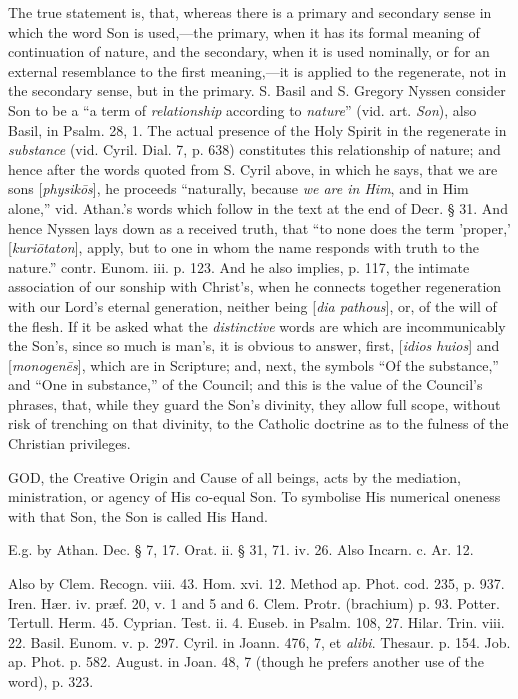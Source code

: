 The true statement is, that, whereas there is a
primary and secondary sense in which the word Son is used,—the
primary, when it has its formal meaning of continuation of nature, and
the secondary, when it is used nominally, or for an external
resemblance to the first meaning,—it is applied to the regenerate,
not in the secondary sense, but in the primary. S. Basil and S. Gregory Nyssen consider Son to be a ``a term of \emph{relationship} according to \emph{nature}''
(vid. art. \emph{Son}), also Basil, in
Psalm. 28, 1. The actual presence of the Holy Spirit in the regenerate
in \emph{substance} (vid. Cyril.
Dial. 7, p. 638) constitutes this relationship of nature; and hence
after the words quoted from S. Cyril above, in which he says, that we
are sons [\emph{physik\={o}s}], he proceeds ``naturally, because \emph{we
are in Him}, and in
Him alone,'' vid. Athan.'s words which follow in the text at the end of
Decr. § 31. And hence Nyssen lays down as a received truth, that ``to
none does the term 'proper,'
[\emph{kuri\={o}taton}], apply,
but to one in whom the name responds with truth to the nature.'' contr.
Eunom. iii. p. 123. And he also implies, p. 117, the intimate
association of our sonship with Christ's, when he connects together
regeneration with our Lord's eternal generation, neither being [\emph{dia
pathous}], or, of the will of the flesh. If it be asked what the \emph{distinctive}
words are which are incommunicably the Son's, since so much is man's,
it is obvious to answer, first, [\emph{idios huios}] and [\emph{monogen\={e}s}],
which are in Scripture; and, next, the symbols ``Of the substance,'' and
``One in substance,'' of the Council; and this is the value of the
Council's phrases, that, while they guard the Son's divinity, they
allow full scope, without risk of trenching on that divinity, to the
Catholic doctrine as to the fulness of the Christian privileges.


GOD,
the Creative Origin and Cause of all beings, acts by the mediation,
ministration, or agency of His co-equal Son. To symbolise His
numerical oneness with that Son, the Son is called His Hand.

E.g. by Athan. Dec. § 7, 17. Orat. ii. § 31,
71. iv. 26. Also Incarn. c. Ar. 12.

Also by Clem. Recogn. viii. 43. Hom. xvi. 12.
Method ap. Phot. cod. 235, p. 937. Iren. Hær. iv. præf. 20, v. 1 and
5 and 6. Clem. Protr. (brachium) p. 93. Potter. Tertull. Herm. 45.
Cyprian. Test. ii. 4. Euseb. in Psalm. 108, 27. Hilar. Trin. viii. 22.
Basil. Eunom. v. p. 297. Cyril. in Joann. 476, 7, et \emph{alibi}.
Thesaur. p. 154. Job. ap. Phot. p. 582. August. in Joan. 48, 7 (though
he prefers another use of the word), p. 323.

